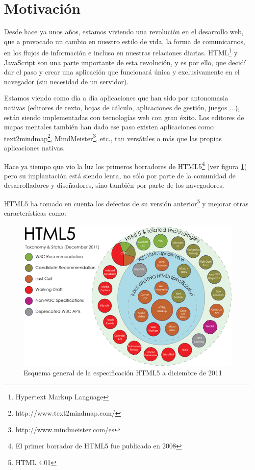 \section{Motivación}

Desde hace ya unos años, estamos viviendo una revolución en el desarrollo web, que a provocado un cambio en nuestro estilo de vida, la forma de comunicarnos, en los flujos de información e incluso en nuestras relaciones diarias. HTML\footnote{Hypertext Markup Language} y JavaScript son una parte importante de esta revolución, y es por ello, que decidí dar el paso y crear una aplicación que funcionará única y exclusivamente en el navegador (sin necesidad de un servidor). 

Estamos viendo como día a día aplicaciones que han sido por antonomasia nativas (editores de texto, hojas de cálculo, aplicaciones de gestión, juegos ...), están siendo implementadas con tecnologías web con gran éxito. Los editores de mapas mentales también han dado ese paso existen aplicaciones como text2mindmap\footnote{http://www.text2mindmap.com/}, MindMeister\footnote{http://www.mindmeister.com/es}, etc., tan versátiles o más que las propias aplicaciones nativas.

Hace ya tiempo que vio la luz los primeros borradores de HTML5\footnote{El primer borrador de HTML5 fue publicado en 2008} (ver figura \ref{fig:html5}) pero su implantación está siendo lenta, no sólo por parte de la comunidad de desarrolladores y diseñadores, sino también por parte de los navegadores. 

HTML5 ha tomado en cuenta los defectos de su versión anterior\footnote{HTML 4.01} y mejorar otras características como: 

\begin{figure}[htbp]
\centering
\includegraphics[width=1.1\textwidth]{imagenes/html5}
\caption{Esquema general de la especificación HTML5 a diciembre de 2011}
\label{fig:html5}
\end{figure}


